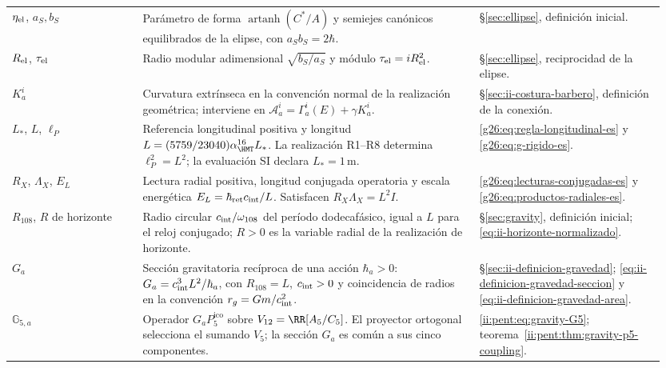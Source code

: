 \begin{longtable}{@{}>{\raggedright\arraybackslash}p{0.19\linewidth}
                    >{\raggedright\arraybackslash}p{0.49\linewidth}
                    >{\raggedright\arraybackslash}p{0.27\linewidth}@{}}
\(\eta_{\rm el}\), \(a_S,b_S\)
& Parámetro de forma \(\operatorname{artanh}(C^*/A)\) y
  semiejes canónicos equilibrados de la elipse, con
  \(a_Sb_S=2\hbar\).
& \S\ref{sec:ellipse}, definición inicial.\\[3pt]

\(R_{\rm el}\), \(\tau_{\rm el}\)
& Radio modular adimensional \(\sqrt{b_S/a_S}\) y módulo
  \(\tau_{\rm el}=iR_{\rm el}^2\).
& \S\ref{sec:ellipse}, reciprocidad de la elipse.\\[3pt]

\(K_a^i\)
& Curvatura extrínseca en la convención normal de la realización
  geométrica; interviene en
  \(\mathcal A_a^i=\Gamma_a^i(E)+\gamma K_a^i\).
& \S\ref{sec:ii-costura-barbero}, definición de la conexión.\\[3pt]

\(L_*\), \(L\), \(\ell_P\)
& Referencia longitudinal positiva y longitud
  \(L=(5759/23040)\alpha_{\HMT}^{16}L_*\).
  La realización R1--R8 determina \(\ell_P^2=L^2\);
  la evaluación SI declara \(L_*=1\,\mathrm m\).
& \eqref{g26:eq:regla-longitudinal-es} y
  \eqref{g26:eq:g-rigido-es}.\\[3pt]

\(R_X\), \(\Lambda_X\), \(E_L\)
& Lectura radial positiva, longitud conjugada operatoria y escala
  energética \(E_L=\hbar_{\rm ret}c_{\rm int}/L\).
  Satisfacen \(R_X\Lambda_X=L^2I\).
& \eqref{g26:eq:lecturas-conjugadas-es} y
  \eqref{g26:eq:productos-radiales-es}.\\[3pt]

\(R_{108}\), \(R\) de horizonte
& Radio circular \(c_{\rm int}/\omega_{108}\) del período
  dodecafásico, igual a \(L\) para el reloj conjugado;
  \(R>0\) es la variable radial de la realización de
  horizonte.
& \S\ref{sec:gravity}, definición inicial;
  \eqref{eq:ii-horizonte-normalizado}.\\[3pt]

\(G_a\)
& Sección gravitatoria recíproca de una acción \(\hbar_a>0\):
  \(G_a=c_{\rm int}^{3}L^{2}/\hbar_a\), con \(R_{108}=L\),
  \(c_{\rm int}>0\) y coincidencia de radios en la convención
  \(r_g=Gm/c_{\rm int}^{2}\).
& \S\ref{sec:ii-definicion-gravedad};
  \eqref{eq:ii-definicion-gravedad-seccion} y
  \eqref{eq:ii-definicion-gravedad-area}.\\[3pt]

\(\mathbb G_{5,a}\)
& Operador \(G_aP^{\mathrm{ico}}_5\) sobre
  \(V_{12}=\RR[A_5/C_5]\). El proyector ortogonal selecciona
  el sumando \(V_5\); la sección \(G_a\) es común a sus cinco
  componentes.
& \eqref{ii:pent:eq:gravity-G5};
  teorema~\ref{ii:pent:thm:gravity-p5-coupling}.\\[3pt]


\end{longtable}
